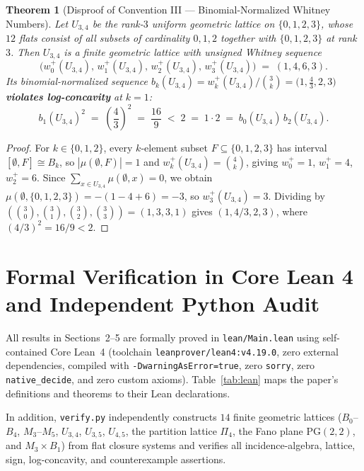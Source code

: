 \documentclass[11pt]{article}
\newtheorem{theorem}{Theorem}[section]
\theoremstyle{definition}
\theoremstyle{remark}
\begin{document}
\begin{theorem}[Disproof of Convention III --- Binomial-Normalized Whitney Numbers]
\label{thm:ulc}
Let $U_{3,4}$ be the rank-$3$ uniform geometric lattice on $\{0,1,2,3\}$, whose $12$ flats consist of all subsets of cardinality $0, 1, 2$ together with $\{0,1,2,3\}$ at rank $3$. Then $U_{3,4}$ is a finite geometric lattice with unsigned Whitney sequence
\[
  \bigl(w_0^+(U_{3,4}),\, w_1^+(U_{3,4}),\, w_2^+(U_{3,4}),\, w_3^+(U_{3,4})\bigr) \;=\; (1, 4, 6, 3).
\]
Its binomial-normalized sequence $b_k(U_{3,4}) = w_k^+(U_{3,4}) / \binom{3}{k} = \bigl(1, \frac{4}{3}, 2, 3\bigr)$ \textbf{violates log-concavity} at $k = 1$:
\[
  b_1(U_{3,4})^2 \;=\; \left(\frac{4}{3}\right)^2 \;=\; \frac{16}{9} \;<\; 2 \;=\; 1 \cdot 2 \;=\; b_0(U_{3,4})\,b_2(U_{3,4}).
\]
\end{theorem}

\begin{proof}
For $k \in \{0,1,2\}$, every $k$-element subset $F \subseteq \{0,1,2,3\}$ has interval $[\emptyset, F] \cong B_k$, so $|\mu(\emptyset, F)| = 1$ and $w_k^+(U_{3,4}) = \binom{4}{k}$, giving $w_0^+ = 1$, $w_1^+ = 4$, $w_2^+ = 6$. Since $\sum_{x \in U_{3,4}} \mu(\emptyset, x) = 0$, we obtain $\mu(\emptyset, \{0,1,2,3\}) = -(1 - 4 + 6) = -3$, so $w_3^+(U_{3,4}) = 3$. Dividing by $(\binom{3}{0}, \binom{3}{1}, \binom{3}{2}, \binom{3}{3}) = (1, 3, 3, 1)$ gives $(1, 4/3, 2, 3)$, where $(4/3)^2 = 16/9 < 2$.
\end{proof}

\section{Formal Verification in Core Lean 4 and Independent Python Audit}

All results in Sections~2--5 are formally proved in \texttt{lean/Main.lean} using self-contained Core Lean~4 (toolchain \texttt{leanprover/lean4:v4.19.0}, zero external dependencies, compiled with \texttt{-DwarningAsError=true}, zero \texttt{sorry}, zero \texttt{native\_decide}, and zero custom axioms). Table~\ref{tab:lean} maps the paper's definitions and theorems to their Lean declarations.

In addition, \texttt{verify.py} independently constructs $14$ finite geometric lattices ($B_0$--$B_4$, $M_3$--$M_5$, $U_{3,4}$, $U_{3,5}$, $U_{4,5}$, the partition lattice $\Pi_4$, the Fano plane $\mathrm{PG}(2,2)$, and $M_3 \times B_1$) from flat closure systems and verifies all incidence-algebra, lattice, sign, log-concavity, and counterexample assertions.
\end{document}
